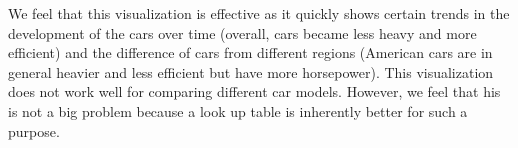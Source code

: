 \documentclass{article}[10pt]
\begin{document}
We feel that this visualization is effective as it quickly shows certain trends
in the development of the cars over time (overall, cars became less heavy and more
efficient)
and the difference of cars from different regions (American cars are in general
heavier and less efficient but have more horsepower). This visualization does
not work well for comparing different car models. However, we feel that his is
not a big problem because a look up table is inherently better for such a purpose.
\end{document}
